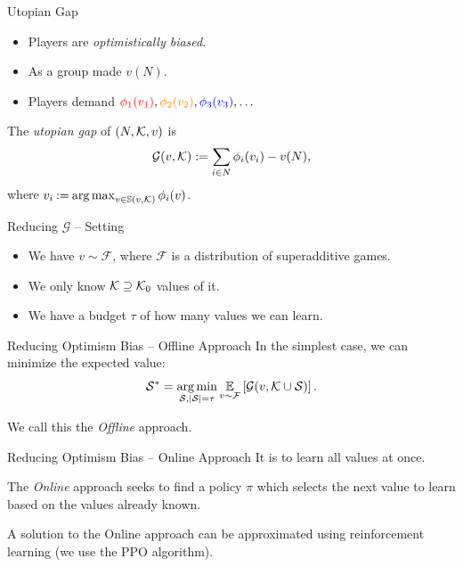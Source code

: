 \documentclass[]{beamer}
\def\blue#1{{\color{blue} #1}}
\def\orange#1{{\color{orange} #1}}
\def\red#1{{\color{red} #1}}
\def\s{\mathcal{S}}
\begin{document}
\begin{frame}{Utopian Gap}
    \begin{itemize}[ ]
        \item Players are \emph{optimistically biased}.
        \item As a group made $ v(N) $.
				\item Players demand $ \red{\shapley[1]{v_1}}, \orange{\shapley[2]{v_2}}, \blue{\shapley[3]{v_3}}, \ldots $
    \end{itemize}
		\vspace{2em}

		\begin{definition}
        The \emph{utopian gap} of $ \left( N, \k, v \right) $ is \[
					\mathcal{G}(v, \k) := \sum_{i \in N} \shapley[i]{v_i} - v(N),
        \]
				where $v_i \deq \argmax_{v \in \mathbb{S}(v,\k)} \shapley[i]v$.
			\end{definition}
\end{frame}

\begin{frame}{Reducing $ \mathcal{G} $ -- Setting}
	\begin{itemize}[ ]
		\item We have $ v \sim \mathcal{F} $, where $ \mathcal{F} $ is a distribution of superadditive games.
		\item We only know $ \k \supseteq \k_0 $ values of it.
		\item We have a budget $ \tau $ of how many values we can learn.
	\end{itemize}
\end{frame}

\begin{frame}{Reducing Optimism Bias -- Offline Approach}
	In the simplest case, we can minimize the expected value: \[
		\s^* = \argmin_{\s, \absolute{\s} = \tau} \E_{v \sim \mathcal{F}} \left[ \mathcal{G}(v,\k \cup \s) \right].
	\]

	\vspace{2em}
	We call this the \emph{Offline} approach.
\end{frame}

\begin{frame}{Reducing Optimism Bias -- Online Approach}
	It is  to learn all values at once.

	The \emph{Online} approach seeks to find a policy $ \pi $ which selects the next value to learn based on the values already known.

	A solution to the Online approach can be approximated using reinforcement learning (we use the PPO algorithm).
\end{frame}
\end{document}
